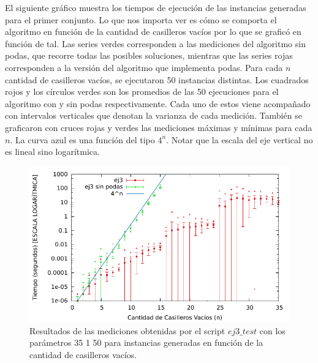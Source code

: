 \par{El siguiente gr\'afico muestra los tiempos de ejecuci\'on de las instancias generadas para el primer conjunto. Lo que nos importa ver es c\'omo se comporta el algoritmo en funci\'on de la cantidad de casilleros vac\'ios por lo que se grafic\'o en funci\'on de tal. Las series verdes corresponden a las mediciones del algoritmo sin podas, que recorre todas las posibles soluciones, mientras que las series rojas corresponden a la versi\'on del algoritmo que implementa podas. Para cada $n$ cantidad de casilleros vac\'ios, se ejecutaron 50 instancias distintas. Los cuadrados rojos y los c\'irculos verdes son los promedios de las 50 ejecuciones para el algoritmo con y sin podas respectivamente. Cada uno de estos viene acompa\~nado con intervalos verticales que denotan la varianza de cada medici\'on. Tambi\'en se graficaron con cruces rojas y verdes las mediciones m\'aximas y m\'inimas para cada $n$. La curva azul es una funci\'on del tipo $4^n$. Notar que la escala del eje vertical no es lineal sino logar\'itmica.}
\begin{figure}[H]
\centering
\def\svgwidth{140 pt}
\includegraphics{../codigo/ej3/tests/ej3a.pdf}
\caption{Resultados de las mediciones obtenidas por el script $ej3\_test$ con los par\'ametros 35 1 50 para instancias generadas en funci\'on de la cantidad de casilleros vac\'ios.}
\end{figure}
